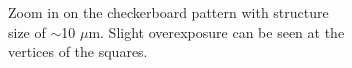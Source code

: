 \begin{figure}[ht]
    \begin{subfigure}[t]{0.3\linewidth}
	\centering
	\caption{Zoom in on the checkerboard pattern with structure size of $\sim$10 $\mu$m. Slight overexposure can be seen at the vertices of the squares.}
	\label{fig:b2d7_q7}
\end{subfigure}
\\
\vspace*{1mm}
    \begin{subfigure}[t]{0.3\linewidth}
	\centering

\end{subfigure}
\end{figure}
